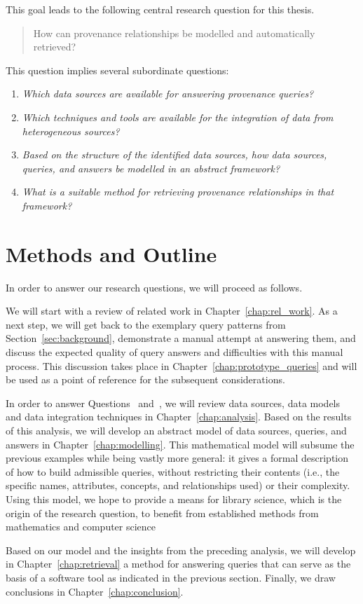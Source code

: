 This goal leads to the following
central research question for this thesis.
%
\begin{quote}
  \begin{itshape}
    How can provenance relationships be modelled and automatically retrieved?
  \end{itshape}
\end{quote}
%
This question implies several subordinate questions:
%
\begin{enumerate}
  \item[\subquestion{1}]
    \emph{Which data sources are available for answering provenance queries?}
  \item[\subquestion{2}]
    \emph{Which techniques and tools are available for the integration
    of data from heterogeneous sources?}
  \item[\subquestion{3}]
    \emph{Based on the structure of the identified data sources,
    how data sources, queries, and answers be modelled in an abstract framework?}
  \item[\subquestion{4}]
    \emph{What is a suitable method for retrieving provenance relationships
    in that framework?}
\end{enumerate}


\section{Methods and Outline}
\label{sec:methods}

In order to answer our research questions, we will proceed as follows.

We will start with a review of related work in Chapter~\ref{chap:rel_work}.
As a next step,
we will get back to the exemplary query patterns from Section~\ref{sec:background},
demonstrate a manual attempt at answering them,
and discuss the expected quality of query answers and difficulties with this manual process.
This discussion takes place in Chapter~\ref{chap:prototype_queries}
and will be used as a point of reference for the subsequent considerations.

In order to answer Questions~ and~, we will review
data sources, data models and data integration techniques in Chapter~\ref{chap:analysis}.
Based on the results of this analysis, we will develop an abstract model of
data sources, queries, and answers in Chapter~\ref{chap:modelling}.
This mathematical model will subsume the previous examples
while being vastly more general: it gives a formal description of how to
build admissible queries, without restricting their contents
(i.e., the specific names, attributes, concepts, and relationships used)
or their complexity. Using this model, we hope to provide a means
for library science, which is the origin of the research question,
to benefit from established methods from mathematics and computer science

Based on our model and the insights from the preceding analysis,
we will develop in Chapter~\ref{chap:retrieval}
a method for answering queries that can serve as the basis of a software tool
as indicated in the previous section.
Finally, we draw conclusions in Chapter~\ref{chap:conclusion}.

